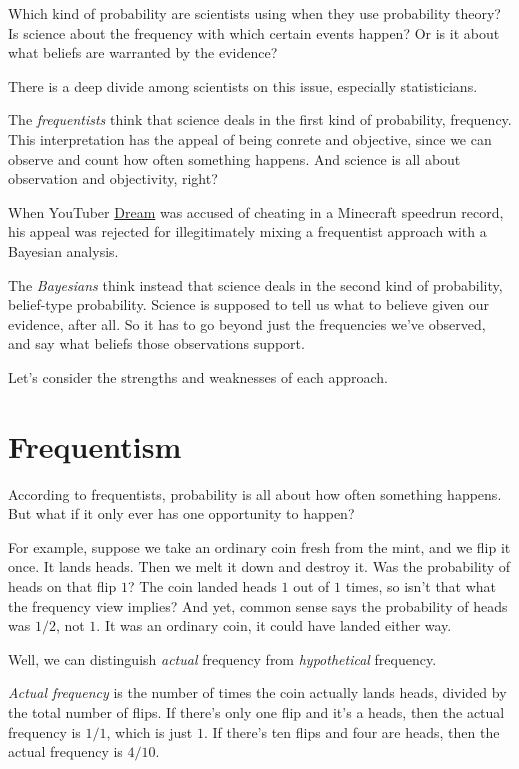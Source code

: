 \documentclass[justified]{tufte-book}
\theoremstyle{definition}
\theoremstyle{definition}
\theoremstyle{definition}
\theoremstyle{definition}
\theoremstyle{remark}
\begin{document}
Which kind of probability are scientists using when they use probability theory? Is science about the frequency with which certain events happen? Or is it about what beliefs are warranted by the evidence?

There is a deep divide among scientists on this issue, especially statisticians.

The \emph{frequentists} think that science deals in the first kind of probability, frequency. This interpretation has the appeal of being conrete and objective, since we can observe and count how often something happens. And science is all about observation and objectivity, right?

\begin{marginfigure}
When YouTuber
\href{https://en.wikipedia.org/wiki/Dream_(YouTuber)}{Dream} was accused
of cheating in a Minecraft speedrun record, his appeal was rejected for
illegitimately mixing a frequentist approach with a Bayesian analysis.
\end{marginfigure}

The \emph{Bayesians} think instead that science deals in the second kind of probability, belief-type probability. Science is supposed to tell us what to believe given our evidence, after all. So it has to go beyond just the frequencies we've observed, and say what beliefs those observations support.

Let's consider the strengths and weaknesses of each approach.

\hypertarget{frequentism}{%
\section{Frequentism}\label{frequentism}}

According to frequentists, probability is all about how often something happens. But what if it only ever has one opportunity to happen?

For example, suppose we take an ordinary coin fresh from the mint, and we flip it once. It lands heads. Then we melt it down and destroy it. Was the probability of heads on that flip \(1\)? The coin landed heads \(1\) out of \(1\) times, so isn't that what the frequency view implies? And yet, common sense says the probability of heads was \(1/2\), not \(1\). It was an ordinary coin, it could have landed either way.

Well, we can distinguish \emph{actual} frequency from \emph{hypothetical} frequency.

\emph{Actual frequency} is the number of times the coin actually lands heads, divided by the total number of flips. If there's only one flip and it's a heads, then the actual frequency is \(1/1\), which is just \(1\). If there's ten flips and four are heads, then the actual frequency is \(4/10\).
\end{document}
